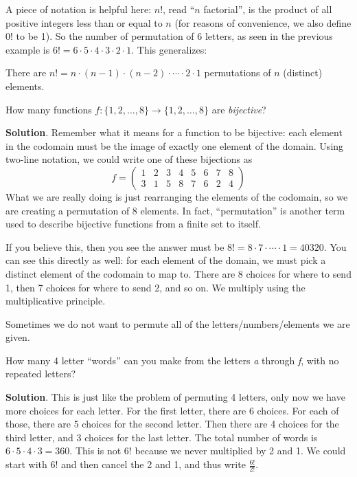 \documentclass[11pt,]{book}
\theoremstyle{ptxplainnotitle}
\theoremstyle{ptxplaintitle}
\theoremstyle{ptxdefinitionnotitle}
\theoremstyle{ptxdefinitiontitle}
\theoremstyle{ptxdefinitionnotitle}
\theoremstyle{ptxdefinitiontitle}
\theoremstyle{ptxdefinitionnotitle}
\theoremstyle{ptxdefinitiontitle}
\theoremstyle{ptxdefinitiontitlenonumber}
\theoremstyle{ptxdefinitiontitlenonumber}
\numberwithin{equation}{chapter}
\newcommand{\twoline}[2]{\begin{pmatrix}#1 \\ #2 \end{pmatrix}}
\newcommand{\amp}{&}
\begin{document}
\hypertarget{p-1420}{}%
A piece of notation is helpful here: \(n!\), read ``\(n\) factorial'', is the product of all positive integers less than or equal to \(n\) (for reasons of convenience, we also define 0! to be 1). So the number of permutation of 6 letters, as seen in the previous example is \(6! = 6\cdot 5 \cdot 4 \cdot 3 \cdot 2 \cdot 1\). This generalizes:%
\begin{assemblage}\label{assemblage-21}
\hypertarget{p-1421}{}%
There are \(n! = n\cdot (n-1)\cdot (n-2)\cdot \cdots \cdot 2\cdot 1\) permutations of \(n\) (distinct) elements.%
\end{assemblage}
\begin{example}\label{example-counting-functions-bijective}
\hypertarget{p-1422}{}%
How many functions \(f:\{1,2,\ldots,8\} \to \{1,2,\ldots, 8\}\) are \emph{bijective}?%
\par\smallskip%
\noindent\textbf{Solution}.\hypertarget{solution-170}{}\quad%
\hypertarget{p-1423}{}%
Remember what it means for a function to be bijective: each element in the codomain must be the image of exactly one element of the domain. Using two-line notation, we could write one of these bijections as%
\begin{equation*}
f = \twoline{1 \amp 2 \amp 3 \amp 4 \amp 5 \amp 6 \amp 7 \amp 8} {3 \amp 1 \amp 5 \amp 8 \amp 7 \amp 6 \amp 2 \amp 4}
\end{equation*}
What we are really doing is just rearranging the elements of the codomain, so we are creating a permutation of 8 elements. In fact, ``permutation'' is another term used to describe bijective functions from a finite set to itself.%
\par
\hypertarget{p-1424}{}%
If you believe this, then you see the answer must be \(8! = 8 \cdot 7 \cdot\cdots\cdot 1 = 40320\). You can see this directly as well: for each element of the domain, we must pick a distinct element of the codomain to map to. There are 8 choices for where to send 1, then 7 choices for where to send 2, and so on. We multiply using the multiplicative principle.%
\end{example}
\hypertarget{p-1425}{}%
Sometimes we do not want to permute all of the letters/numbers/elements we are given.%
\begin{example}\label{example-44}
\hypertarget{p-1426}{}%
How many 4 letter ``words'' can you make from the letters \emph{a} through \emph{f}, with no repeated letters?%
\par\smallskip%
\noindent\textbf{Solution}.\hypertarget{solution-171}{}\quad%
\hypertarget{p-1427}{}%
This is just like the problem of permuting 4 letters, only now we have more choices for each letter. For the first letter, there are 6 choices. For each of those, there are 5 choices for the second letter. Then there are 4 choices for the third letter, and 3 choices for the last letter. The total number of words is \(6\cdot 5\cdot 4 \cdot 3 = 360\). This is not \(6!\) because we never multiplied by 2 and 1. We could start with \(6!\) and then cancel the 2 and 1, and thus write \(\frac{6!}{2!}\).%
\end{example}
\end{document}
